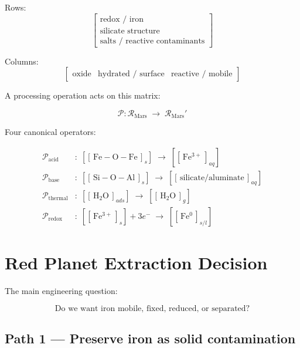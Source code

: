 \documentclass[11pt,a4paper]{article}
\newcommand{\cidb}[2]{\!\left[\!\left[\,#1\,\right]_{\!#2}\!\right]}
\newcommand{\Rmat}{\mathcal{R}_{\mathrm{Mars}}}%
\newcommand{\Proc}{\mathcal{P}}                %
\begin{document}
\noindent
Rows:
\[
\begin{bmatrix}
\text{redox / iron}\\[2pt]
\text{silicate structure}\\[2pt]
\text{salts / reactive contaminants}
\end{bmatrix}
\]

\noindent
Columns:
\[
\begin{bmatrix}
\text{oxide} & \text{hydrated / surface} & \text{reactive / mobile}
\end{bmatrix}
\]

A processing operation acts on this matrix:

\[
\Proc : \Rmat \;\rightarrow\; \Rmat'
\]

\medskip\noindent
Four canonical operators:

\begin{align*}
\Proc_{\text{acid}}    &:\;
  \cidb{\mathrm{Fe{-}O{-}Fe}}{s}
  \;\rightarrow\;
  \cidb{\mathrm{Fe^{3+}}}{aq}
\\[8pt]
\Proc_{\text{base}}    &:\;
  \cidb{\mathrm{Si{-}O{-}Al}}{s}
  \;\rightarrow\;
  \cidb{\text{silicate/aluminate}}{aq}
\\[8pt]
\Proc_{\text{thermal}} &:\;
  \cidb{\mathrm{H_2O}}{ads}
  \;\rightarrow\;
  \cidb{\mathrm{H_2O}}{g}
\\[8pt]
\Proc_{\text{redox}}   &:\;
  \cidb{\mathrm{Fe^{3+}}}{s}
  + 3e^-
  \;\rightarrow\;
  \cidb{\mathrm{Fe^0}}{s/l}
\end{align*}

\section{Red Planet Extraction Decision}

The main engineering question:

\begin{keybox}
\[\text{Do we want iron mobile, fixed, reduced, or separated?}\]
\end{keybox}

\subsection*{Path 1 --- Preserve iron as solid contamination}
\end{document}
